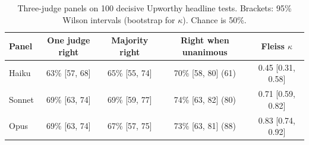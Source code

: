 \begin{table}[t]\centering\small
\caption{Three-judge panels on 100 decisive Upworthy headline tests. Brackets: 95\% Wilson intervals (bootstrap for $\kappa$). Chance is 50\%.}\label{tab:taste}
\begin{tabular}{lcccc}\toprule
Panel & One judge right & Majority right & Right when unanimous & Fleiss $\kappa$ \\\midrule
Haiku & 63\% [57, 68] & 65\% [55, 74] & 70\% [58, 80] (61) & 0.45 [0.31, 0.58] \\
Sonnet & 69\% [63, 74] & 69\% [59, 77] & 74\% [63, 82] (80) & 0.71 [0.59, 0.82] \\
Opus & 69\% [63, 74] & 67\% [57, 75] & 73\% [63, 81] (88) & 0.83 [0.74, 0.92] \\
\bottomrule\end{tabular}\end{table}
